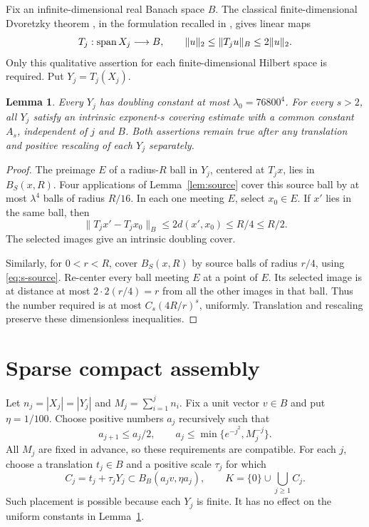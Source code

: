 \documentclass[
  11pt,
]{article}
\newtheorem{lemma}[theorem]{Lemma}
\theoremstyle{remark}\newtheorem{remark}[theorem]{Remark}
\newcommand{\norm}[1]{\lVert#1\rVert}\newcommand{\ip}[2]{\langle#1,#2\rangle}
\begin{document}
Fix an infinite-dimensional real Banach space $B$. The classical finite-dimensional Dvoretzky theorem \cite{Dvoretzky}, in the formulation recalled in \cite[Theorem 1.1]{COO}, gives linear maps
\[
 T_j:\spanop X_j\longrightarrow B,
 \qquad \norm u_2\le\norm{T_ju}_B\le2\norm u_2.
\]
Only this qualitative assertion for each finite-dimensional Hilbert space is required. Put $Y_j=T_j(X_j)$.

\begin{lemma}\label{lem:uniform-cluster}
Every $Y_j$ has doubling constant at most $\lambda_0=76800^4$. For every $s>2$, all $Y_j$ satisfy an intrinsic exponent-$s$ covering estimate with a common constant $A_s$, independent of $j$ and $B$. Both assertions remain true after any translation and positive rescaling of each $Y_j$ separately.
\end{lemma}
\begin{proof}
The preimage $E$ of a radius-$R$ ball in $Y_j$, centered at $T_jx$, lies in $B_S(x,R)$. Four applications of Lemma~\ref{lem:source} cover this source ball by at most $\lambda^4$ balls of radius $R/16$. In each one meeting $E$, select $x_0\in E$. If $x'$ lies in the same ball, then
\[
 \norm{T_jx'-T_jx_0}_B\le2d(x',x_0)\le R/4\le R/2.
\]
The selected images give an intrinsic doubling cover.

Similarly, for $0<r<R$, cover $B_S(x,R)$ by source balls of radius $r/4$, using \eqref{eq:s-source}. Re-center every ball meeting $E$ at a point of $E$. Its selected image is at distance at most $2\cdot2(r/4)=r$ from all the other images in that ball. Thus the number required is at most $C_s(4R/r)^s$, uniformly. Translation and rescaling preserve these dimensionless inequalities.
\end{proof}

\section{Sparse compact assembly}\label{sec:assembly}
Let $n_j=|X_j|=|Y_j|$ and $M_j=\sum_{i=1}^j n_i$. Fix a unit vector $v\in B$ and put $\eta=1/100$. Choose positive numbers $a_j$ recursively such that
\begin{equation}\label{eq:placement-scales}
 a_{j+1}\le a_j/2,\qquad
 a_j\le\min\{e^{-j^2},M_j^{-j}\}.
\end{equation}
All $M_j$ are fixed in advance, so these requirements are compatible. For each $j$, choose a translation $t_j\in B$ and a positive scale $\tau_j$ for which
\[
 C_j=t_j+\tau_jY_j\subset B_B(a_jv,\eta a_j),
 \qquad K=\{0\}\cup\bigcup_{j\ge1}C_j.
\]
Such placement is possible because each $Y_j$ is finite. It has no effect on the uniform constants in Lemma~\ref{lem:uniform-cluster}.
\end{document}
